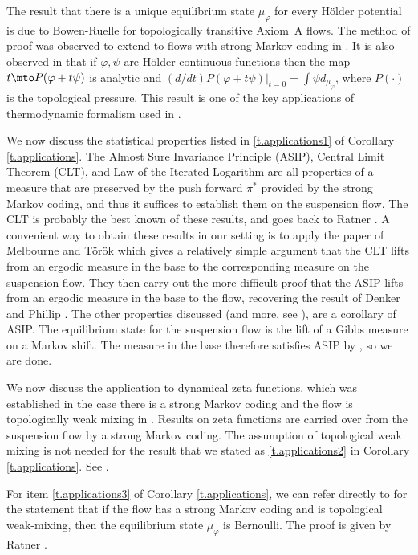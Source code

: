 The result that there is a unique equilibrium state $\mu_\varphi$ for every Hölder potential is due to Bowen-Ruelle \cite{bowen-ruelle} for topologically transitive Axiom~A flows. The method of proof was observed to extend to flows with strong Markov coding in \cite{pollicott}. It is also observed in \cite{pollicott} that if $\varphi, \psi$ are Hölder continuous functions then the map $t \mto P(\varphi + t \psi)$ is analytic and $(d/dt)P(\varphi+ t \psi)|_{t=0} = \int \psi d_{\mu_\varphi}$, where $P(\cdot)$ is the topological pressure. This result is one of the key applications of thermodynamic formalism used in \cite{bcls, aS16}.

We now discuss the statistical properties listed in \eqref{t.applications1} of Corollary \ref{t.applications}. The Almost Sure Invariance Principle (ASIP), Central Limit Theorem (CLT), and Law of the Iterated Logarithm are all properties of a measure that are preserved by the push forward $\pi^\ast$ provided by the strong Markov coding, and thus it suffices to establish them on the suspension flow. The CLT is probably the best known of these results, and goes back to Ratner \cite{ratner}.
A convenient way to obtain these results in our setting is to apply the paper of Melbourne and Török \cite{MT04} which gives a relatively simple argument that the CLT lifts from an ergodic measure in the base to the corresponding measure on the suspension flow. They then carry out the more difficult proof that the ASIP lifts from an ergodic measure in the base to the flow, recovering the result of Denker and Phillip \cite{DP84}. The other properties discussed (and more, see \cite{MT04}), are a corollary of ASIP. The equilibrium state for the suspension flow is the lift of a Gibbs measure on a Markov shift. The measure in the base therefore satisfies ASIP by \cite{DP84}, so we are done.

We now discuss the application to dynamical zeta functions, which was established in the case there is a strong Markov coding and the flow is topologically weak mixing in \cite{pollicott}. Results on zeta functions are carried over from the suspension flow by a strong Markov coding. The assumption of topological weak mixing is not needed for the result that we stated as \eqref{t.applications2} in Corollary \ref{t.applications}. See \cite[Chap.\,6]{PP}.

For item \eqref{t.applications3} of Corollary \ref{t.applications}, we can refer directly to \cite{pollicott} for the statement that if the flow has a strong Markov coding and is topological weak-mixing, then the equilibrium state $\mu_\varphi$ is Bernoulli. The proof is given by Ratner \cite{ratner2}.

